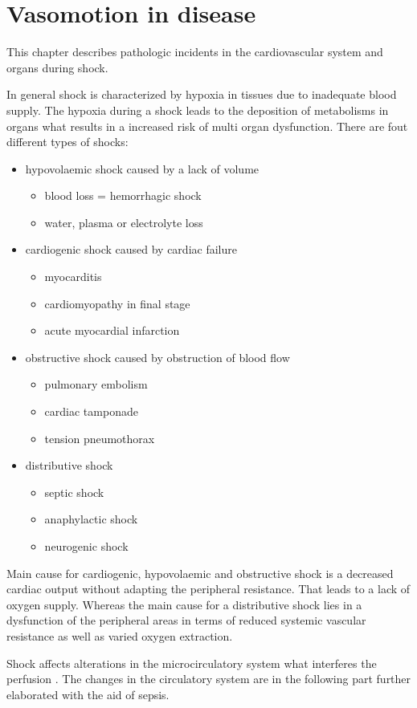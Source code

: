 \chapter{Vasomotion in disease}
This chapter describes pathologic incidents in the cardiovascular system and organs during shock.

In general shock is characterized by hypoxia in tissues due to inadequate blood supply. The hypoxia during a shock leads to the deposition of metabolisms in organs what results in a increased risk of multi organ dysfunction. 
There are fout different types of shocks: \cite{lauridsen2015;vincent2013}
\begin{itemize}
	\item hypovolaemic shock caused by a lack of volume
	\begin{itemize}
		\item blood loss = hemorrhagic shock
		\item water, plasma or electrolyte loss
	\end{itemize}
	\item cardiogenic shock caused by cardiac failure
	\begin{itemize}
		\item myocarditis
		\item cardiomyopathy in final stage
		\item acute myocardial infarction
	\end{itemize}
	\item obstructive shock caused by obstruction of blood flow
	\begin{itemize}
		\item pulmonary embolism
		\item cardiac tamponade
		\item tension pneumothorax
	\end{itemize} 
	\item distributive shock
	\begin{itemize}
		\item septic shock
		\item anaphylactic shock
		\item neurogenic shock
	\end{itemize}
\end{itemize}

Main cause for cardiogenic, hypovolaemic and obstructive shock is a decreased cardiac output without adapting the peripheral resistance. That leads to a lack of oxygen supply.
Whereas the main cause for a distributive shock lies in a dysfunction of the peripheral areas in terms of reduced systemic vascular resistance as well as varied oxygen extraction. \cite{vincent2013}

Shock affects alterations in the microcirculatory system what interferes the perfusion \cite{maier2012}. The changes in the circulatory system are in the following part further elaborated with the aid of sepsis.